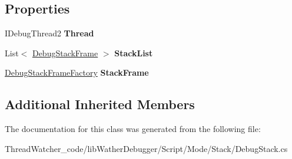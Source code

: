 \subsection*{Properties}
\begin{DoxyCompactItemize}
\item 
\hypertarget{classlib_wather_debugger_1_1_script_1_1_mode_1_1_stack_1_1_debug_stack_a5b7fa014aa89f7d46259e8ac3b8e5358}{I\+Debug\+Thread2 {\bfseries Thread}}\label{classlib_wather_debugger_1_1_script_1_1_mode_1_1_stack_1_1_debug_stack_a5b7fa014aa89f7d46259e8ac3b8e5358}

\item 
\hypertarget{classlib_wather_debugger_1_1_script_1_1_mode_1_1_stack_1_1_debug_stack_a1384c7ee31a956e6c5ef9072852f1bae}{List$<$ \hyperlink{classlib_wather_debugger_1_1_stack_1_1_debug_stack_frame}{Debug\+Stack\+Frame} $>$ {\bfseries Stack\+List}}\label{classlib_wather_debugger_1_1_script_1_1_mode_1_1_stack_1_1_debug_stack_a1384c7ee31a956e6c5ef9072852f1bae}

\item 
\hypertarget{classlib_wather_debugger_1_1_script_1_1_mode_1_1_stack_1_1_debug_stack_ab8a458e4af2b2200c59bd554254d1d23}{\hyperlink{classlib_wather_debugger_1_1_stack_1_1_debug_stack_frame_factory}{Debug\+Stack\+Frame\+Factory} {\bfseries Stack\+Frame}}\label{classlib_wather_debugger_1_1_script_1_1_mode_1_1_stack_1_1_debug_stack_ab8a458e4af2b2200c59bd554254d1d23}

\end{DoxyCompactItemize}
\subsection*{Additional Inherited Members}


The documentation for this class was generated from the following file\+:\begin{DoxyCompactItemize}
\item 
Thread\+Watcher\+\_\+code/lib\+Wather\+Debugger/\+Script/\+Mode/\+Stack/Debug\+Stack.\+cs\end{DoxyCompactItemize}
